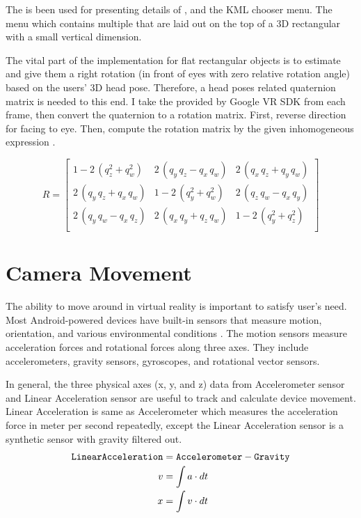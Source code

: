 The  is been used for presenting details of , and the KML chooser menu. The menu which contains multiple  that are laid out on the top of a 3D rectangular  with a small vertical dimension.

The vital part of the implementation for flat rectangular objects is to estimate and give them a right rotation (in front of eyes with zero relative rotation angle) based on the users' 3D head pose. Therefore, a head poses related quaternion matrix \cite{jvv.quaternions.2013} is needed to this end. I take the   provided by Google VR SDK from each frame, then convert the quaternion to a rotation matrix. First, reverse direction  for facing to eye. Then, compute the rotation matrix by the given inhomogeneous expression \cite{wiki.quaternion-mat.2016}.

\begin{equation}
\label{equ:quaternion-matrix}
R = 
	\begin{bmatrix}
	1 - 2\,(q_z^2 + q_w^2) & 2\,(q_y\,q_z - q_x\,q_w) & 2\,(q_x\,q_z + q_y\,q_w)\\
	2\,(q_y\,q_z + q_x\,q_w) & 1 - 2\,(q_y^2 + q_w^2) & 2\,(q_z\,q_w - q_x\,q_y)\\
	2\,(q_y\,q_w - q_x\,q_z) & 2\,(q_x\,q_y + q_z\,q_w) & 1 - 2\,(q_y^2 + q_z^2)\\
	\end{bmatrix}
\end{equation}

\section{Camera Movement}

The ability to move around in virtual reality is important to satisfy user's need. Most Android-powered devices have built-in sensors that measure motion, orientation, and various environmental conditions \cite{google.sensors.2016}. The motion sensors measure acceleration forces and rotational forces along three axes. They include accelerometers, gravity sensors, gyroscopes, and rotational vector sensors. 

In general, the three physical axes (x, y, and z) data from Accelerometer sensor and Linear Acceleration sensor are useful to track and calculate device movement. Linear Acceleration is same as Accelerometer which measures the acceleration force in meter per second repeatedly, except the Linear Acceleration sensor is a synthetic sensor with gravity filtered out. 
\[
\begin{array}{lr}
\begin{aligned}
\texttt{LinearAcceleration} &= \texttt{Accelerometer} - \texttt{Gravity}\\
v &= \int a \cdot dt\\
x &= \int v \cdot dt\\
\end{aligned}
\end{array}
\]

